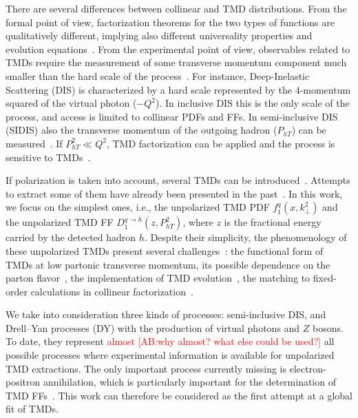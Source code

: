 \documentclass[aps,preprintnumbers,showpacs,nofootinbib,superscriptaddress,floatfix]{revtex4}
\newcommand{\T}{\perp}
\begin{document}
There are several differences between collinear and TMD distributions. From
the formal point of view, factorization theorems for the two types of
functions are qualitatively different, implying also different universality
properties and evolution equations~\cite{Rogers:2015sqa}. From the
experimental point 
of view, observables related to TMDs require the measurement of some transverse
momentum component much smaller than the hard scale of the
process~\cite{Bacchetta:2016ccz,Radici:2016hbh}.  For
instance, Deep-Inelastic Scattering (DIS) is characterized by a hard scale represented by the
4-momentum squared of the virtual photon ($-Q^2$). In inclusive DIS this is
the only scale of the process, and access is limited to collinear PDFs
and FFs. In semi-inclusive DIS (SIDIS) also the transverse momentum of the
outgoing  
hadron ($P_{hT}$) can be measured~\cite{Mulders:1995dh,Bacchetta:2006tn}. 
If $P_{hT}^2\ll Q^2$, TMD
factorization can be applied and the process is sensitive to
TMDs~\cite{Collins:2011zzd}. 


If polarization is taken into account, several TMDs can be
introduced~\cite{Mulders:1995dh,Boer:1997nt,%
Bacchetta:2000jk,%
Mulders:2000sh,%
Boer:2016xqr%
}. Attempts to extract some of them have already been presented in the past~\cite{Bacchetta:2011gx,Anselmino:2012aa,Echevarria:2014xaa,Anselmino:2016uie,%
Lu:2009ip,Barone:2015ksa,%
Lefky:2014eia,%
Anselmino:2013vqa,Kang:2015msa%
}.  In
this work, we focus on the simplest ones, i.e., the unpolarized TMD
PDF $f_1^q(x,k_{\T}^2)$ and the unpolarized TMD
FF $D_1^{q \to h}(z,P_{hT}^2)$, where $z$ is
  the fractional energy carried by the detected hadron $h$. Despite their
  simplicity, the phenomenology of these unpolarized TMDs present several
  challenges~\cite{Signori:2016lvd}: the functional form of TMDs at low
  partonic transverse momentum, its possible dependence on the parton
  flavor~\cite{Signori:2013mda}, the implementation of TMD
  evolution~\cite{Bacchetta:2015ora,Rogers:2015sqa}, the matching to
  fixed-order calculations in collinear
  factorization~\cite{Collins:2016hqq}. 

We take into consideration three kinds of processes: semi-inclusive DIS, and
Drell--Yan processes (DY) with the production of virtual photons and $Z$
bosons. To date, they represent \textcolor{red}{almost [AB:why almost? what
  else could be used?]} all possible processes
  where experimental information is available for unpolarized TMD
  extractions. 
The only important
process currently missing is electron-positron annihilation, which is
particularly important for the determination of TMD
FFs~\cite{Bacchetta:2015ora}. This work can therefore be considered as the
first attempt at a global fit of TMDs.  
\end{document}
